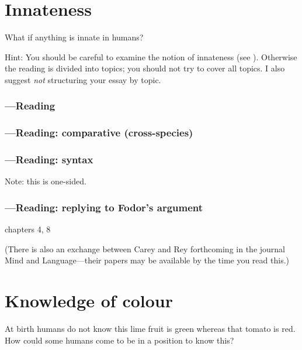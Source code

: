 \documentclass[12pt,\papersize]{extarticle}
\begin{document}

\section{Innateness}
What if anything is innate in humans?

Hint: You should be careful to examine the notion of innateness  (see \citealp{Samuels:2004ho}).  Otherwise the reading is divided into topics; you should not try to cover all topics.  I also suggest \emph{not} structuring your essay by topic.

\subsubsection{---Reading}


\subsubsection{---Reading: comparative (cross-species)}




\subsubsection{---Reading: syntax}

Note: this is one-sided.






\subsubsection{---Reading: replying to Fodor’s argument}


 chapters 4, 8

(There is also an exchange between Carey and Rey forthcoming in the journal Mind and Language---their papers may be available by the time you read this.)




\section{Knowledge of colour}
At birth humans do not know this lime fruit is green whereas that tomato is red.
How could some humans come to be in a position to know this?
\end{document}
